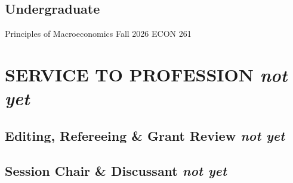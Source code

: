 \documentclass[final, 12pt]{article}
\begin{document}

  


\subsection*{Undergraduate}

 Principles of Macroeconomics \tabto{9cm} Fall 2026 ECON 261
 
 


\section*{SERVICE TO PROFESSION \it not yet}

\subsection*{Editing, Refereeing \& Grant Review \it not yet}

 




\subsection*{Session Chair \& Discussant \it not yet}
\end{document}
